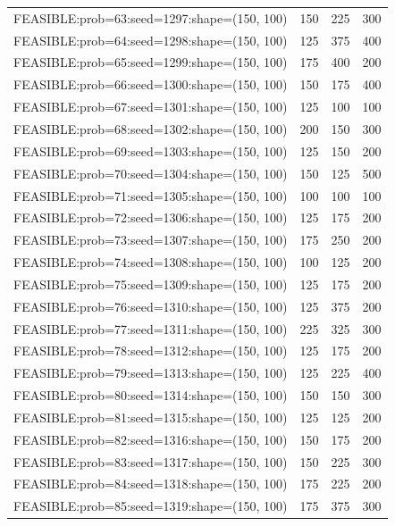 \begin{longtable}{lccc}
FEASIBLE:prob=63:seed=1297:shape=(150, 100)  &      150 &   225 &    300 \\
FEASIBLE:prob=64:seed=1298:shape=(150, 100)  &      125 &   375 &    400 \\
FEASIBLE:prob=65:seed=1299:shape=(150, 100)  &      175 &   400 &    200 \\
FEASIBLE:prob=66:seed=1300:shape=(150, 100)  &      150 &   175 &    400 \\
FEASIBLE:prob=67:seed=1301:shape=(150, 100)  &      125 &   100 &    100 \\
FEASIBLE:prob=68:seed=1302:shape=(150, 100)  &      200 &   150 &    300 \\
FEASIBLE:prob=69:seed=1303:shape=(150, 100)  &      125 &   150 &    200 \\
FEASIBLE:prob=70:seed=1304:shape=(150, 100)  &      150 &   125 &    500 \\
FEASIBLE:prob=71:seed=1305:shape=(150, 100)  &      100 &   100 &    100 \\
FEASIBLE:prob=72:seed=1306:shape=(150, 100)  &      125 &   175 &    200 \\
FEASIBLE:prob=73:seed=1307:shape=(150, 100)  &      175 &   250 &    200 \\
FEASIBLE:prob=74:seed=1308:shape=(150, 100)  &      100 &   125 &    200 \\
FEASIBLE:prob=75:seed=1309:shape=(150, 100)  &      125 &   175 &    200 \\
FEASIBLE:prob=76:seed=1310:shape=(150, 100)  &      125 &   375 &    200 \\
FEASIBLE:prob=77:seed=1311:shape=(150, 100)  &      225 &   325 &    300 \\
FEASIBLE:prob=78:seed=1312:shape=(150, 100)  &      125 &   175 &    200 \\
FEASIBLE:prob=79:seed=1313:shape=(150, 100)  &      125 &   225 &    400 \\
FEASIBLE:prob=80:seed=1314:shape=(150, 100)  &      150 &   150 &    300 \\
FEASIBLE:prob=81:seed=1315:shape=(150, 100)  &      125 &   125 &    200 \\
FEASIBLE:prob=82:seed=1316:shape=(150, 100)  &      150 &   175 &    200 \\
FEASIBLE:prob=83:seed=1317:shape=(150, 100)  &      150 &   225 &    300 \\
FEASIBLE:prob=84:seed=1318:shape=(150, 100)  &      175 &   225 &    200 \\
FEASIBLE:prob=85:seed=1319:shape=(150, 100)  &      175 &   375 &    300 \\

\end{longtable}
